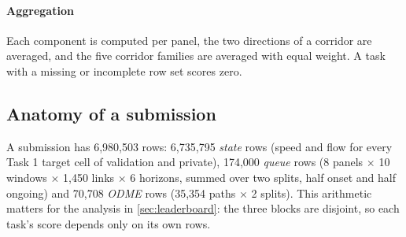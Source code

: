 \paragraph{Aggregation} Each component is computed per panel, the two directions of a corridor are averaged, and the
five corridor families are averaged with equal weight. A task with a missing or incomplete row set scores zero.

\subsection{Anatomy of a submission}
A submission has 6,980,503 rows: 6,735,795 \emph{state} rows (speed and flow for every Task 1 target cell of
validation and private), 174,000 \emph{queue} rows (8 panels $\times$ 10 windows $\times$ 1,450 links $\times$ 6
horizons, summed over two splits, half onset and half ongoing) and 70,708 \emph{ODME} rows (35,354 paths $\times$ 2
splits). This arithmetic matters for the analysis in \cref{sec:leaderboard}: the three blocks are disjoint, so each
task's score depends only on its own rows.

